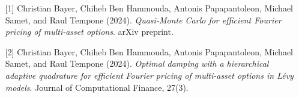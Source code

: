 \begin{talk}
\medskip

\begin{enumerate}
	\item[{[1]}] Christian Bayer, Chiheb Ben Hammouda, Antonis Papapantoleon, Michael Samet, and Raul
Tempone (2024). {\it Quasi-Monte Carlo for efficient Fourier pricing of multi-asset options}. arXiv preprint.
	\item[{[2]}] Christian Bayer, Chiheb Ben Hammouda, Antonis Papapantoleon, Michael Samet, and Raul
Tempone (2024). {\it Optimal damping with a hierarchical adaptive quadrature for efficient Fourier
pricing of multi-asset options in Lévy models}. Journal of Computational Finance, 27(3).

\end{enumerate}

\end{talk}

